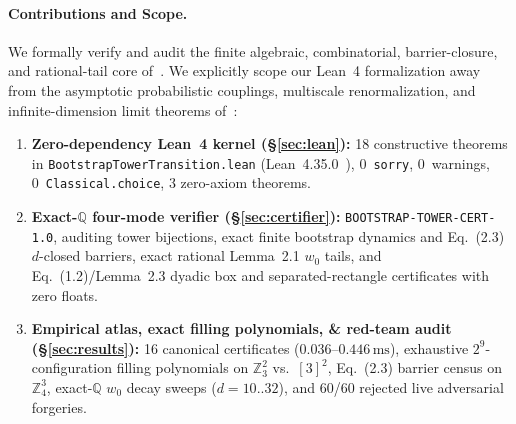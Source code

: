 \documentclass[11pt,twocolumn]{article}
\newcommand{\ZZ}{\mathbb{Z}}
\newcommand{\QQ}{\mathbb{Q}}
\begin{document}
\paragraph{Contributions and Scope.}
We formally verify and audit the finite algebraic, combinatorial, barrier-closure, and rational-tail core of~\cite{koval2026tower}. We explicitly scope our Lean~4 formalization away from the asymptotic probabilistic couplings, multiscale renormalization, and infinite-dimension limit theorems of~\cite{koval2026tower}:
\begin{enumerate}[leftmargin=*,nosep]
  \item \textbf{Zero-dependency Lean~4 kernel (\S\ref{sec:lean}):} 18 constructive theorems in \texttt{BootstrapTowerTransition.lean} (Lean~4.35.0~\cite{demoura2021lean4}), 0~\texttt{sorry}, 0~warnings, 0~\texttt{Classical.choice}, 3 zero-axiom theorems.
  \item \textbf{Exact-$\QQ$ four-mode verifier (\S\ref{sec:certifier}):} \texttt{BOOTSTRAP-TOWER-CERT-1.0}, auditing tower bijections, exact finite bootstrap dynamics and Eq.~(2.3) $d$-closed barriers, exact rational Lemma~2.1 $w_0$ tails, and Eq.~(1.2)/Lemma~2.3 dyadic box and separated-rectangle certificates with zero floats.
  \item \textbf{Empirical atlas, exact filling polynomials, \& red-team audit (\S\ref{sec:results}):} 16 canonical certificates ($0.036$--$0.446\,\mathrm{ms}$), exhaustive $2^9$-configuration filling polynomials on $\ZZ_3^2$ vs.\ $[3]^2$, Eq.~(2.3) barrier census on $\ZZ_4^3$, exact-$\QQ$ $w_0$ decay sweeps ($d=10..32$), and 60/60 rejected live adversarial forgeries.
\end{enumerate}
\end{document}
